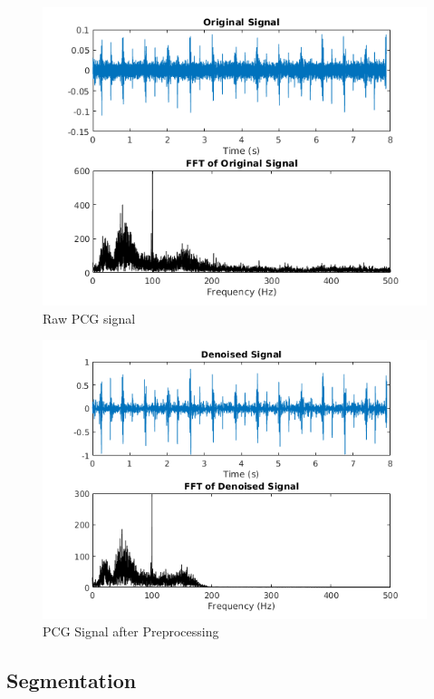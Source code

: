 \documentclass[10pt,twocolumn]{witseiepaper}
\begin{document}
\begin{figure}[h!]
    \centering
    \includegraphics[scale=0.5]{orig.png}
    \caption{Raw PCG signal}
    \label{orig}
\end{figure}{}

\begin{figure}[h!]
    \centering
    \includegraphics[scale=0.5]{denoise1.png}
    \caption{PCG Signal after Preprocessing}
    \label{denoise}
\end{figure}

\subsection{Segmentation}
\end{document}
